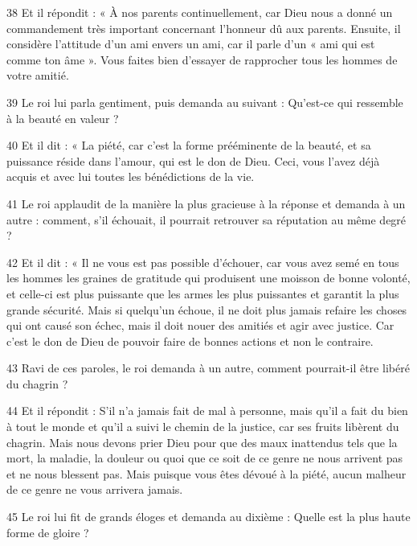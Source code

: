 \par 38 Et il répondit : « À nos parents continuellement, car Dieu nous a donné un commandement très important concernant l'honneur dû aux parents. Ensuite, il considère l'attitude d'un ami envers un ami, car il parle d'un « ami qui est comme ton âme ». Vous faites bien d’essayer de rapprocher tous les hommes de votre amitié.

\par 39 Le roi lui parla gentiment, puis demanda au suivant : Qu'est-ce qui ressemble à la beauté en valeur ?

\par 40 Et il dit : « La piété, car c'est la forme prééminente de la beauté, et sa puissance réside dans l'amour, qui est le don de Dieu. Ceci, vous l'avez déjà acquis et avec lui toutes les bénédictions de la vie.

\par 41 Le roi applaudit de la manière la plus gracieuse à la réponse et demanda à un autre : comment, s'il échouait, il pourrait retrouver sa réputation au même degré ?

\par 42 Et il dit : « Il ne vous est pas possible d'échouer, car vous avez semé en tous les hommes les graines de gratitude qui produisent une moisson de bonne volonté, et celle-ci est plus puissante que les armes les plus puissantes et garantit la plus grande sécurité. Mais si quelqu’un échoue, il ne doit plus jamais refaire les choses qui ont causé son échec, mais il doit nouer des amitiés et agir avec justice. Car c'est le don de Dieu de pouvoir faire de bonnes actions et non le contraire.

\par 43 Ravi de ces paroles, le roi demanda à un autre, comment pourrait-il être libéré du chagrin ?

\par 44 Et il répondit : S'il n'a jamais fait de mal à personne, mais qu'il a fait du bien à tout le monde et qu'il a suivi le chemin de la justice, car ses fruits libèrent du chagrin. Mais nous devons prier Dieu pour que des maux inattendus tels que la mort, la maladie, la douleur ou quoi que ce soit de ce genre ne nous arrivent pas et ne nous blessent pas. Mais puisque vous êtes dévoué à la piété, aucun malheur de ce genre ne vous arrivera jamais.

\par 45 Le roi lui fit de grands éloges et demanda au dixième : Quelle est la plus haute forme de gloire ?


